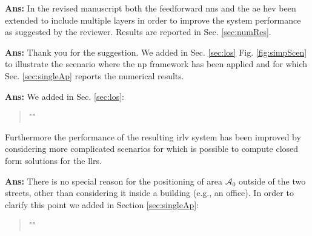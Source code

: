 \documentclass[draftcls,onecolumn,12pt]{IEEEtran}
\newcounter{revc}
\newcommand{\revp}[1]{\zref[revcontent]{#1}}
\begin{document}
\vspace{5mm} %
\begin{framed}
\end{framed}

{\bf Ans:} In the revised manuscript both the feedforward \acp{nn} and the \ac{ae} hev been extended to include multiple layers in order to improve the system performance as suggested by the reviewer. Results are reported in Sec. \ref{sec:numRes}.

\vspace{5mm} %
\begin{framed}
\end{framed}

{\bf Ans:} Thank you for the suggestion. We added in Sec. \ref{sec:los} Fig. \ref{fig:simpScen} to illustrate the scenario where the \ac{np} framework has been applied and for which Sec. \ref{sec:singleAp} reports the numerical results.

\vspace{5mm} %
\begin{framed}
\end{framed}

{\bf Ans:} We added in Sec. \ref{sec:los}:
\begin{quote}
"\revp{llrComp}"
\end{quote}

Furthermore the performance of the resulting \ac{irlv} system has been improved by considering more complicated scenarios for which is possible to compute closed form solutions for the \acp{llr}.

\vspace{5mm} %
\begin{framed}
\end{framed}

{\bf Ans:} There is no special reason for the positioning of area $\mathcal A_0$ outside of the two streets, other than considering it inside a building (e.g., an office). In order to clarify this point we added in Section \ref{sec:singleAp}:
\begin{quote}
"\revp{building}"
\end{quote}
\end{document}
